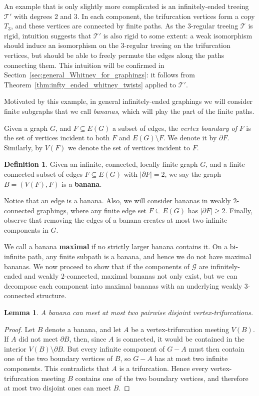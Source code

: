 \documentclass{article}
\theoremstyle{plain}
\newtheorem{lem}[thm]{Lemma}
\theoremstyle{definition}
\newtheorem{defn}[thm]{Definition}
\begin{document}
An example that is only slightly more complicated is an infinitely-ended treeing $\mathcal{T}'$ with degrees 2 and 3. In each component, the trifurcation vertices form a copy $T_3$, and these vertices are connected by finite paths. As the 3-regular treeing $\mathcal{T}$ is rigid, intuition suggests that $\mathcal{T}'$ is also rigid to some extent: a weak isomorphism should induce an isomorphism on the 3-regular treeing on the trifurcation vertices, but should be able to freely permute the edges along the paths connecting them. This intuition will be confirmed in Section~\ref{sec:general_Whitney_for_graphings}: it follows from  Theorem~\ref{thm:infty_ended_whitney_twists} applied to $\mathcal{T}'$.

Motivated by this example, in general infinitely-ended graphings we will consider finite subgraphs that we call \emph{bananas}, which will play the part of the finite paths. 

Given a graph $G$, and $F \subseteq E(G)$ a subset of edges, the \emph{vertex boundary of} $F$ is the set of vertices incident to both $F$ and $E(G)\setminus F$. We denote it by $\partial F$. Similarly, by $V(F)$ we denote the set of vertices incident to $F$. 

\begin{defn}
Given an infinite, connected, locally finite graph $G$, and a finite connected subset of edges $F \subseteq E(G)$ with $|\partial F|=2$, we say the graph $B=(V(F), F)$ is a \textbf{banana}. 
\end{defn}

Notice that an edge is a banana. Also, we will consider bananas in weakly $2$-connected graphings, where any finite edge set $F \subseteq E(G)$ has $|\partial F| \geq 2$. Finally, observe that removing the edges of a banana creates at most two infinite components in $G$.

We call a banana \textbf{maximal} if no strictly larger banana contains it. On a bi-infinite path, any finite subpath is a banana, and hence we do not have maximal bananas. We now proceed to show that if the components of $\mathcal{G}$ are infinitely-ended and weakly $2$-connected, maximal bananas not only exist, but we can decompose each component into maximal bananas with an underlying weakly $3$-connected structure.

\begin{lem}\label{lem:banana_trifurc}
A banana can meet at most two pairwise disjoint vertex-trifurcations.

\end{lem}
\begin{proof}
    Let $B$ denote a banana, and let $A$ be a vertex-trifurcation meeting $V(B)$. If $A$ did not meet $\partial B$, then, since $A$ is connected, it would be contained in the interior $V(B)\setminus\partial B$. But every infinite component of $G-A$ must then contain one of the two boundary vertices of $B$, so $G-A$ has at most two infinite components. This contradicts that $A$ is a trifurcation. Hence every vertex-trifurcation meeting $B$ contains one of the two boundary vertices, and therefore at most two disjoint ones can meet $B$.
\end{proof}
\end{document}
